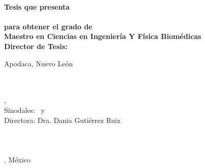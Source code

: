 \begin{titlepage}
	{\large \color{ctcolortitle}\textbf{\thesisTitle} \\[15mm]}
	{\large \textbf{Tesis que presenta}} \\[10mm]
	{\large \thesisName} \\[10mm]
	{\large \textbf{para obtener el grado de}} \\[10mm]
	{\large \textbf{Maestro en Ciencias en Ingeniería Y Física Biomédicas}}\\[10mm]
	{\large \textbf{Director de Tesis:} \thesisFirstSupervisor}
	\vfill
	\begin{flushleft}
		{\large Apodaca, Nuevo León}
		\hfill
		{\large \thesisDate}
	\end{flushleft}

\end{titlepage}


\hfill
\vfill
{
	\small
	\textbf{\thesisName} \\
	\textit{\thesisTitle} \\
	\thesisSubject, \thesisDate \\
	Sinodales: \thesisFirstReviewer\ y \thesisSecondReviewer \\
	Directora: Dra. Dania Gutiérrez Ruiz\\[1.5em]
	\textbf{\thesisUniversity} \\
	\thesisUniversityDepartment \\
	\thesisUniversityStreetAddress \thesisUniversityPostalCode\\ 
	\thesisUniversityCity, México
}
